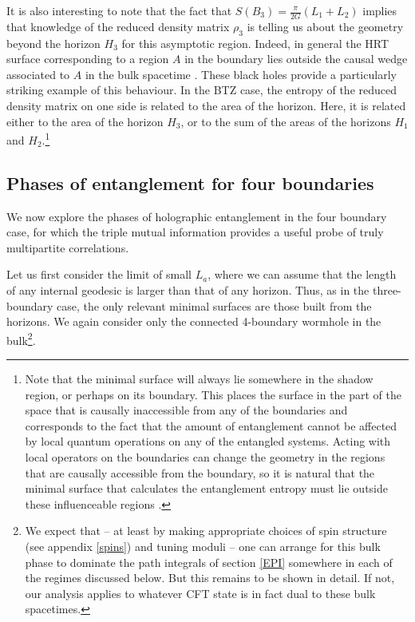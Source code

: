 \documentclass[12pt]{article}
\numberwithin{equation}{section}
\begin{document}
It is also interesting to note that the fact that $S(B_3) = \frac{\pi}{2 G} (L_1 + L_2)$ implies that knowledge of the reduced density matrix $\rho_3$ is telling us about the geometry beyond the horizon $H_3$ for this asymptotic region.  Indeed, in general the HRT surface corresponding to a region $A$ in the boundary lies outside the causal wedge associated to $A$ in the bulk spacetime \cite{Wall:2012uf}. These black holes provide a particularly striking example of this behaviour. In the BTZ case, the entropy of the reduced density matrix on one side is related to the area of the horizon. Here, it is related either to the area of the horizon $H_3$, or to the sum of the areas of the horizons $H_1$ and $H_2$.\footnote{Note that the minimal surface will always lie somewhere in the shadow region, or perhaps on its boundary.  This places the surface in the part of the space that is causally inaccessible from any of the boundaries and corresponds to the fact that the amount of entanglement cannot be affected by local quantum operations on any of the entangled systems. Acting with local operators on the boundaries can change the geometry in the regions that are causally accessible from the boundary, so it is natural that the minimal surface that calculates the entanglement entropy must lie outside these influenceable regions \cite{Wall:2012uf,MVM}.}




%
\subsection{Phases of entanglement for four boundaries}
%
\label{depend}

We now explore the phases of holographic entanglement in the four boundary case, for which the triple mutual information provides a useful probe of truly multipartite correlations.

Let us first consider the limit of small $L_a$, where we can assume that the length of any internal geodesic is larger than that of any horizon.  Thus, as in the three-boundary case, the only relevant minimal surfaces are those built from the horizons.  We again consider only the connected 4-boundary wormhole in the bulk\footnote{We expect that -- at least by making appropriate choices of spin structure (see appendix \ref{spins}) and tuning moduli -- one can arrange for this bulk phase to dominate the path integrals of section \ref{EPI} somewhere in each of the regimes discussed below.  But this remains to be shown in detail.  If not, our analysis applies to whatever CFT state is in fact dual to these bulk spacetimes.}.
\end{document}
